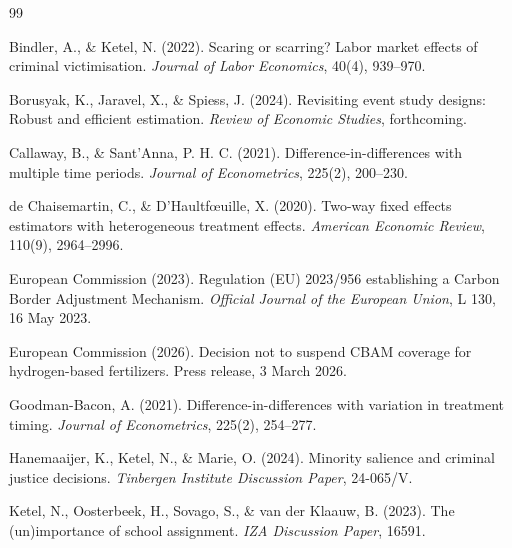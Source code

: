 \documentclass[11pt,a4paper]{article}
\begin{document}

\begin{thebibliography}{99}

Bindler, A., \& Ketel, N. (2022).
\newblock Scaring or scarring? Labor market effects of criminal victimisation.
\newblock \textit{Journal of Labor Economics}, 40(4), 939--970.

Borusyak, K., Jaravel, X., \& Spiess, J. (2024).
\newblock Revisiting event study designs: Robust and efficient estimation.
\newblock \textit{Review of Economic Studies}, forthcoming.

Callaway, B., \& Sant'Anna, P. H. C. (2021).
\newblock Difference-in-differences with multiple time periods.
\newblock \textit{Journal of Econometrics}, 225(2), 200--230.

de Chaisemartin, C., \& D'Haultf{\oe}uille, X. (2020).
\newblock Two-way fixed effects estimators with heterogeneous treatment effects.
\newblock \textit{American Economic Review}, 110(9), 2964--2996.

European Commission (2023).
\newblock Regulation (EU) 2023/956 establishing a Carbon Border Adjustment Mechanism.
\newblock \textit{Official Journal of the European Union}, L 130, 16 May 2023.

European Commission (2026).
\newblock Decision not to suspend CBAM coverage for hydrogen-based fertilizers.
\newblock Press release, 3 March 2026.

Goodman-Bacon, A. (2021).
\newblock Difference-in-differences with variation in treatment timing.
\newblock \textit{Journal of Econometrics}, 225(2), 254--277.

Hanemaaijer, K., Ketel, N., \& Marie, O. (2024).
\newblock Minority salience and criminal justice decisions.
\newblock \textit{Tinbergen Institute Discussion Paper}, 24-065/V.

Ketel, N., Oosterbeek, H., Sovago, S., \& van der Klaauw, B. (2023).
\newblock The (un)importance of school assignment.
\newblock \textit{IZA Discussion Paper}, 16591.


\end{thebibliography}
\end{document}
